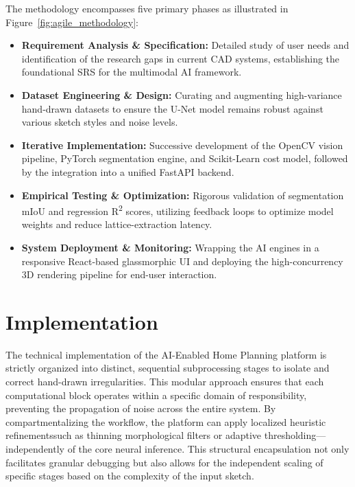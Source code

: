 \documentclass[12pt]{report}
\begin{document}
The methodology encompasses five primary phases as illustrated in Figure~\ref{fig:agile_methodology}:

\begin{itemize}
  \item \textbf{Requirement Analysis \& Specification:} Detailed study of user needs and identification of the research gaps in current CAD systems, establishing the foundational SRS for the multimodal AI framework\cite{eastman2018, pizarro2022}.
  \item \textbf{Dataset Engineering \& Design:} Curating and augmenting high-variance hand-drawn datasets to ensure the U-Net model remains robust against various sketch styles and noise levels\cite{chen2019, ronneberger2015}.
  \item \textbf{Iterative Implementation:} Successive development of the OpenCV vision pipeline, PyTorch segmentation engine, and Scikit-Learn cost model, followed by the integration into a unified FastAPI backend\cite{opencv2024, pytorch2024, sklearn2024}.
  \item \textbf{Empirical Testing \& Optimization:} Rigorous validation of segmentation mIoU and regression R\textsuperscript{2} scores, utilizing feedback loops to optimize model weights and reduce lattice-extraction latency\cite{ronneberger2015, wang2020}.
  \item \textbf{System Deployment \& Monitoring:} Wrapping the AI engines in a responsive React-based glassmorphic UI and deploying the high-concurrency 3D rendering pipeline for end-user interaction\cite{fastapi2024, threejs2024}.
\end{itemize}
\section{Implementation}

The technical implementation of the AI-Enabled Home Planning platform is strictly organized into distinct, sequential subprocessing stages to isolate and correct hand-drawn irregularities\cite{opencv2024, ronneberger2015}. 
This modular approach ensures that each computational block operates within a specific domain of responsibility, preventing the propagation of noise across the entire system. By compartmentalizing the workflow, the platform can apply localized heuristic refinements\—such as thinning morphological filters or adaptive thresholding—independently of the core neural inference. This structural encapsulation not only facilitates granular debugging but also allows for the independent scaling of specific stages based on the complexity of the input sketch.
\end{document}
